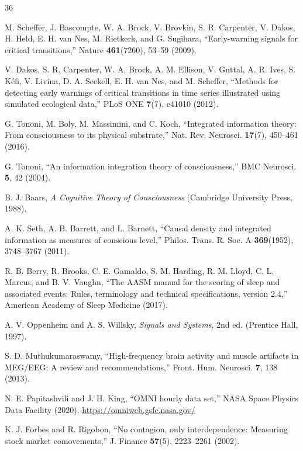 \documentclass[12pt,a4paper]{article}
\begin{document}
\begin{thebibliography}{36}

 M. Scheffer, J. Bascompte, W. A. Brock, V. Brovkin, S. R. Carpenter, V. Dakos, H. Held, E. H. van Nes, M. Rietkerk, and G. Sugihara, ``Early-warning signals for critical transitions,'' Nature \textbf{461}(7260), 53--59 (2009).

 V. Dakos, S. R. Carpenter, W. A. Brock, A. M. Ellison, V. Guttal, A. R. Ives, S. K{\'e}fi, V. Livina, D. A. Seekell, E. H. van Nes, and M. Scheffer, ``Methods for detecting early warnings of critical transitions in time series illustrated using simulated ecological data,'' PLoS ONE \textbf{7}(7), e41010 (2012).

 G. Tononi, M. Boly, M. Massimini, and C. Koch, ``Integrated information theory: From consciousness to its physical substrate,'' Nat. Rev. Neurosci. \textbf{17}(7), 450--461 (2016).

 G. Tononi, ``An information integration theory of consciousness,'' BMC Neurosci. \textbf{5}, 42 (2004).

 B. J. Baars, \emph{A Cognitive Theory of Consciousness} (Cambridge University Press, 1988).

 A. K. Seth, A. B. Barrett, and L. Barnett, ``Causal density and integrated information as measures of conscious level,'' Philos. Trans. R. Soc. A \textbf{369}(1952), 3748--3767 (2011).

 R. B. Berry, R. Brooks, C. E. Gamaldo, S. M. Harding, R. M. Lloyd, C. L. Marcus, and B. V. Vaughn, ``The AASM manual for the scoring of sleep and associated events: Rules, terminology and technical specifications, version 2.4,'' American Academy of Sleep Medicine (2017).

 A. V. Oppenheim and A. S. Willsky, \emph{Signals and Systems}, 2nd ed. (Prentice Hall, 1997).

 S. D. Muthukumaraswamy, ``High-frequency brain activity and muscle artifacts in MEG/EEG: A review and recommendations,'' Front. Hum. Neurosci. \textbf{7}, 138 (2013).

 N. E. Papitashvili and J. H. King, ``OMNI hourly data set,'' NASA Space Physics Data Facility (2020). \url{https://omniweb.gsfc.nasa.gov/}

 K. J. Forbes and R. Rigobon, ``No contagion, only interdependence: Measuring stock market comovements,'' J. Finance \textbf{57}(5), 2223--2261 (2002).


\end{thebibliography}
\end{document}
